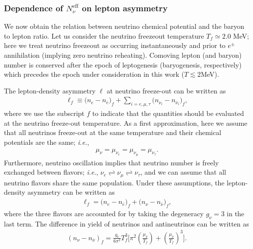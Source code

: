 \subsubsection{Dependence of $N_\nu^{\mathrm{eff}}$ on lepton asymmetry}
We now obtain the relation between neutrino chemical potential and the baryon to lepton ratio. Let us consider the neutrino freezeout temperature $T_f\simeq 2.0$ MeV; here we treat neutrino freezeout as occurring instantaneously and prior to $e^\pm$ annihilation (implying zero neutrino reheating). Comoving lepton (and baryon) number is conserved after the epoch of leptogenesis (baryogenesis, respectively) which precedes the epoch  under consideration in this work ($T\lesssim 2$\;MeV). %

The lepton-density asymmetry $\ell $ at neutrino freeze-out can be written as
\begin{align}
\ell_f \equiv\big(n_e-n_{\overline{e}}\big)_f+\sum_{i=e,\mu, \tau}\big(n_{\nu_i}-n_{\overline{\nu}_i}\big)_f,
\end{align}
where we use the subscript $f$ to indicate that the quantities should be evaluated at the neutrino freeze-out temperature. As a first approximation, here we assume that all neutrinos freeze-out at the same temperature and their chemical potentials are the same; {\it i.e.\/},
\begin{align}
\mu_\nu=\mu_{\nu_e}=\mu_{\nu_\mu}=\mu_{\nu_\tau}.
\end{align}
Furthermore, neutrino oscillation implies that neutrino number is freely exchanged between flavors; {\it i.e.\/}, $\nu_e\rightleftharpoons\nu_\mu\rightleftharpoons\nu_\tau$, and we can assume that all neutrino flavors share the same population. Under these assumptions, the lepton-density asymmetry can be written as
\begin{align}
\label{L_asymmetry} 
\ell_f=\big(n_e-n_{\overline{e}}\big)_f+\big(n_{\nu}-n_{\overline{\nu}}\big)_f,
\end{align}
where the three flavors are accounted for by taking the degeneracy $g_\nu=3$ in the last term. The difference in yield of neutrinos and antineutrinos can be written as
\begin{align}
\label{Excess_Neutrino}
\left(n_\nu-n_{\overline{\nu}}\right)_f=\frac{g_\nu}{6\pi^2}T^3_f\bigg[\pi^2\left(\frac{\mu_\nu}{T_f}\right)+\left(\frac{\mu_\nu}{T_f}\right)^{\!\!3}\bigg].
\end{align}


